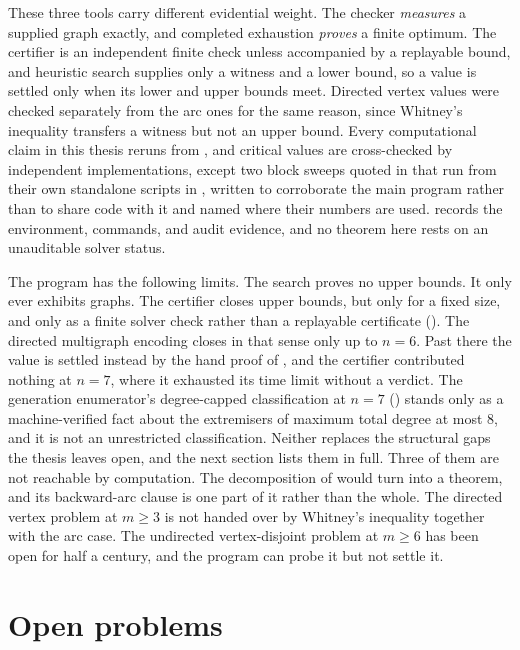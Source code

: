 These three tools carry different evidential weight. The checker \emph{measures} a supplied graph exactly, and completed exhaustion \emph{proves} a finite optimum. The certifier is an independent finite check unless accompanied by a replayable bound, and heuristic search supplies only a witness and a lower bound, so a value is settled only when its lower and upper bounds meet. Directed vertex values were checked separately from the arc ones for the same reason, since Whitney's inequality transfers a witness but not an upper bound. Every computational claim in this thesis reruns from , and critical values are cross-checked by independent implementations, except two block sweeps quoted in  that run from their own standalone scripts in , written to corroborate the main program rather than to share code with it and named where their numbers are used.  records the environment, commands, and audit evidence, and no theorem here rests on an unauditable solver status.

The program has the following limits. The search proves no upper bounds. It only ever exhibits graphs. The certifier closes upper bounds, but only for a fixed size, and only as a finite solver check rather than a replayable certificate (). The directed multigraph encoding closes in that sense only up to $n = 6$. Past there the value is settled instead by the hand proof of , and the certifier contributed nothing at $n = 7$, where it exhausted its time limit without a verdict. The generation enumerator's degree-capped classification at $n = 7$ () stands only as a machine-verified fact about the extremisers of maximum total degree at most $8$, and it is not an unrestricted classification. Neither replaces the structural gaps the thesis leaves open, and the next section lists them in full. Three of them are not reachable by computation. The decomposition of  would turn  into a theorem, and its backward-arc clause is one part of it rather than the whole. The directed vertex problem at $m \ge 3$ is not handed over by Whitney's inequality together with the arc case. The undirected vertex-disjoint problem at $m \ge 6$ has been open for half a century, and the program can probe it but not settle it.

\section{Open problems}

